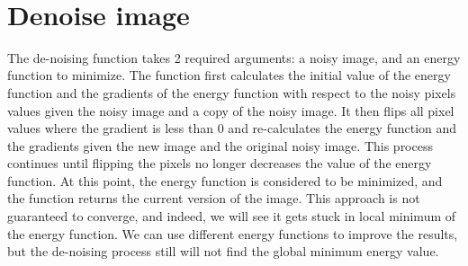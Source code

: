 \documentclass[11pt]{article}
\begin{document}
    \begin{center}
    \end{center}
    { \hspace*{\fill} \\}
    
    \hypertarget{denoise-image}{%
\section{Denoise image}\label{denoise-image}}

The de-noising function takes 2 required arguments: a noisy image, and
an energy function to minimize. The function first calculates the
initial value of the energy function and the gradients of the energy
function with respect to the noisy pixels values given the noisy image
and a copy of the noisy image. It then flips all pixel values where the
gradient is less than 0 and re-calculates the energy function and the
gradients given the new image and the original noisy image. This process
continues until flipping the pixels no longer decreases the value of the
energy function. At this point, the energy function is considered to be
minimized, and the function returns the current version of the image.
This approach is not guaranteed to converge, and indeed, we will see it
gets stuck in local minimum of the energy function. We can use different
energy functions to improve the results, but the de-noising process
still will not find the global minimum energy value.
\end{document}
